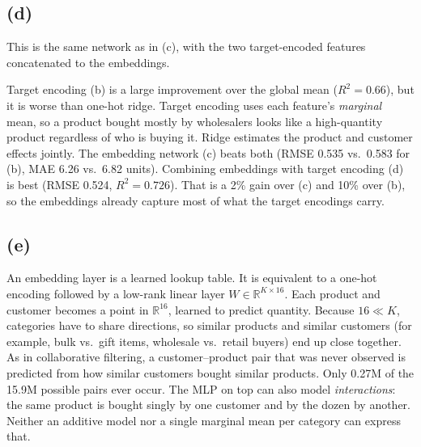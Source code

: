 \documentclass[11pt]{article}
\newcommand{\R}{\mathbb{R}}
\begin{document}
\subsection*{(d)}
This is the same network as in (c), with the two target-encoded features concatenated to the embeddings.

\begin{table}[H]
\centering\small

\caption*{Test-set results.}
\end{table}

\noindent Target encoding (b) is a large improvement over the global mean ($R^2=0.66$), but it is worse than one-hot ridge. Target encoding uses each feature's \emph{marginal} mean, so a
product bought mostly by wholesalers looks like a high-quantity product regardless of who is buying it. Ridge estimates the product and customer effects jointly.
The embedding network (c) beats both (RMSE 0.535 vs.\ 0.583 for (b), MAE 6.26 vs.\ 6.82 units). Combining embeddings with target encoding (d) is best (RMSE 0.524,
$R^2=0.726$). That is a 2\% gain over (c) and 10\% over (b), so the embeddings already capture most of what the target encodings carry.

\subsection*{(e)}
An embedding layer is a learned lookup table. It is equivalent to a one-hot encoding followed by a low-rank linear layer $W\in\R^{K\times16}$. Each product and
customer becomes a point in $\R^{16}$, learned to predict quantity. Because $16\ll K$, categories have to share directions, so similar products and similar customers (for example,
bulk vs.\ gift items, wholesale vs.\ retail buyers) end up close together. As in collaborative filtering, a customer--product pair that was never observed is predicted from
how similar customers bought similar products. Only 0.27M of the 15.9M possible pairs ever occur. The MLP on top can also model \emph{interactions}: the same product is bought
singly by one customer and by the dozen by another. Neither an additive model nor a single marginal mean per category can express that.

\begin{table}[H]
\centering\small
\resizebox{\linewidth}{!}{}
\caption*{Test RMSE (log scale) by number of training rows of the row's rarer category (customer or product).}
\end{table}
\end{document}
